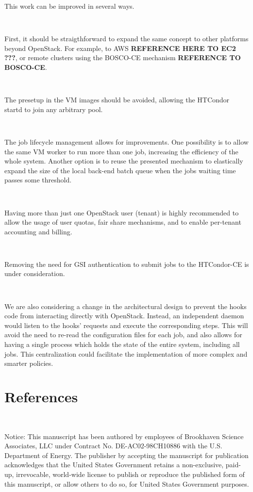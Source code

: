 \documentclass[a4paper]{jpconf}
\begin{document}
This work can be improved in several ways. 

~

First, it should be straigthforward to expand the same concept to other
platforms beyond OpenStack. For example, to AWS \textbf{REFERENCE HERE TO EC2
???}, or remote clusters using the BOSCO-CE mechanism \textbf{REFERENCE TO BOSCO-CE}.

~

The presetup in the VM images should be avoided, allowing the HTCondor startd to join any arbitrary pool.

~

The job lifecycle management allows for improvements. 
One possibility is to allow the same VM worker to run more than one job,
increasing the efficiency of the whole system. Another option is to reuse the
presented mechanism to elastically expand the size of the local back-end batch
queue when the jobs waiting time passes some threshold.

~

Having more than just one OpenStack user (tenant) is highly recommended to allow
the usage of user quotas, fair share mechanisms, and to enable per-tenant
accounting and billing.

~

Removing the need for GSI authentication to submit jobs to the HTCondor-CE is under consideration.

~

We are also considering a change in the architectural design to prevent the
hooks code from interacting directly with OpenStack. Instead, an independent
daemon would listen to the hooks' requests and execute the corresponding steps.
This will avoid the need to re-read the configuration files for each job, 
and also allows for having a single process which holds the state of the entire
system, including all jobs. This centralization could facilitate the
implementation of more complex and smarter policies.
 




\section*{References}{}




~

Notice:
This manuscript has been authored by employees of Brookhaven Science Associates,
LLC under Contract No. DE-AC02-98CH10886 with the U.S. Department of Energy.
The publisher by accepting the manuscript for publication acknowledges
that the United States Government retains a non-exclusive, paid-up, irrevocable,
world-wide license to publish or reproduce the published form of this manuscript,
or allow others to do so, for United States Government purposes.
\end{document}
